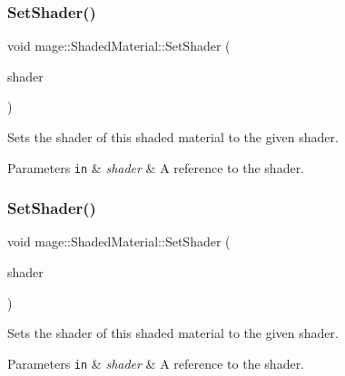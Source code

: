 \hypertarget{structmage_1_1_shaded_material_a65646872fce0961e7ac346be162e89ec}{}\label{structmage_1_1_shaded_material_a65646872fce0961e7ac346be162e89ec} 
\subsubsection{\texorpdfstring{Set\+Shader()}{SetShader()}\hspace{0.1cm}{\footnotesize\ttfamily [1/2]}}
{\footnotesize\ttfamily void mage\+::\+Shaded\+Material\+::\+Set\+Shader (\begin{DoxyParamCaption}\item[{const \hyperlink{structmage_1_1_combined_shader}{Combined\+Shader} \&}]{shader }\end{DoxyParamCaption})}

Sets the shader of this shaded material to the given shader.


\begin{DoxyParams}[1]{Parameters}
\mbox{\tt in}  & {\em shader} & A reference to the shader. \\
\hline
\end{DoxyParams}
\hypertarget{structmage_1_1_shaded_material_ae1c0fe052ef1cfb3c65ddf1ad9de8abb}{}\label{structmage_1_1_shaded_material_ae1c0fe052ef1cfb3c65ddf1ad9de8abb} 
\subsubsection{\texorpdfstring{Set\+Shader()}{SetShader()}\hspace{0.1cm}{\footnotesize\ttfamily [2/2]}}
{\footnotesize\ttfamily void mage\+::\+Shaded\+Material\+::\+Set\+Shader (\begin{DoxyParamCaption}\item[{\hyperlink{structmage_1_1_combined_shader}{Combined\+Shader} \&\&}]{shader }\end{DoxyParamCaption})}

Sets the shader of this shaded material to the given shader.


\begin{DoxyParams}[1]{Parameters}
\mbox{\tt in}  & {\em shader} & A reference to the shader. \\
\hline
\end{DoxyParams}
\hypertarget{structmage_1_1_shaded_material_ae9c4286f2802a30698863c9abe95e60d}{}\label{structmage_1_1_shaded_material_ae9c4286f2802a30698863c9abe95e60d} 
